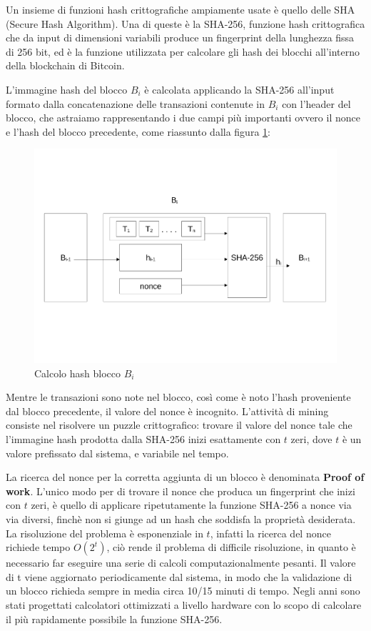 Un insieme di funzioni hash crittografiche ampiamente usate è quello delle SHA (Secure Hash Algorithm). Una di queste è la SHA-256, funzione hash crittografica che da input di dimensioni variabili produce un fingerprint della lunghezza fissa di 256 bit, ed è la funzione utilizzata per calcolare gli hash dei blocchi all’interno della blockchain di Bitcoin.

L’immagine hash del blocco $B_i$ è calcolata applicando la SHA-256 all’input formato dalla concatenazione delle transazioni contenute in $B_i$ con l'header del blocco, che astraiamo rappresentando i due campi più importanti ovvero il nonce e l'hash del blocco precedente, come riassunto dalla figura \ref{fig:sha-256}:
\begin{figure}[h!]
    \centering
    \includegraphics[scale=0.4, trim = 1cm 4cm 0cm 4cm, clip]{Images/blocchi_sha.pdf}
    \caption{Calcolo hash blocco $B_i$}
    \label{fig:sha-256}
\end{figure}
\FloatBarrier
Mentre le transazioni sono note nel blocco, così come è noto l’hash proveniente dal blocco precedente, il valore del nonce è incognito. L’attività di mining consiste nel risolvere un puzzle crittografico: trovare il valore del nonce tale che l’immagine hash prodotta dalla SHA-256 inizi esattamente con $t$ zeri, dove $t$ è un valore prefissato dal sistema, e variabile nel tempo.

La ricerca del nonce per la corretta aggiunta di un blocco è denominata \textbf{Proof of work}. L'unico modo per di trovare il nonce che produca un fingerprint che inizi con $t$ zeri, è quello di applicare ripetutamente la funzione SHA-256 a nonce via via diversi, finchè non si giunge ad un hash che soddisfa la proprietà desiderata. La risoluzione del problema è esponenziale in $t$, infatti la ricerca del nonce richiede tempo $O(2^t)$, ciò rende il problema di difficile risoluzione, in quanto è necessario far eseguire una serie di calcoli computazionalmente pesanti. Il valore di t viene aggiornato periodicamente dal sistema, in modo che la validazione di un blocco richieda sempre in media circa 10/15 minuti di tempo. Negli anni sono stati progettati calcolatori ottimizzati a livello hardware con lo scopo di calcolare il più rapidamente possibile la funzione SHA-256.

